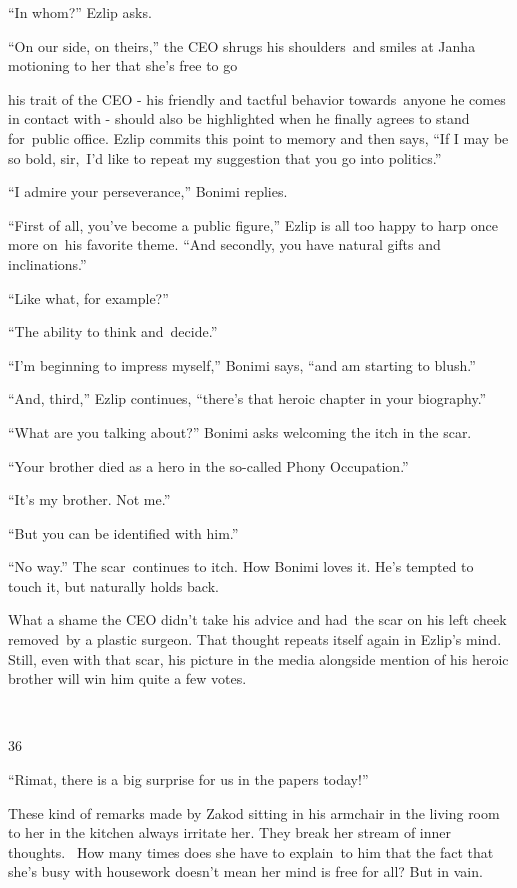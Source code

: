 \documentclass[twoside,11pt]{book}
\begin{document}
``In whom?'' Ezlip asks. 

``On our side, on theirs,'' the CEO shrugs his shoulders\ and smiles at Janha motioning to her
that she's free to go 

his trait of the CEO - his friendly and tactful behavior towards\ anyone he comes in contact with - should also be
highlighted when he finally agrees to stand for~public office.  Ezlip commits this point to memory and then says,
``If I may be so bold, sir,\ I'd like to repeat my suggestion that you go into politics.'' 

``I admire your perseverance,'' Bonimi replies. 

``First of all, you{}'ve become a public figure,'' Ezlip is all too happy to harp once more
on\ his favorite theme. ``And secondly, you have natural gifts and inclinations.''

``Like what, for example?'' 

``The ability to think and~decide.'' 

``I'm beginning to impress myself,'' Bonimi says, ``and am starting to
blush.'' 

``And, third,'' Ezlip continues, ``there's that heroic chapter in your
biography.''

``What are you talking about?'' Bonimi asks welcoming the itch in the scar.~

``Your brother died as a hero in the so-called Phony Occupation.'' 

``It's my brother. Not me.'' 

``But you can be identified with him.'' 

``No way.'' The scar\ continues to itch. How Bonimi loves it. He's tempted to touch it, but
naturally holds back.\ \ 

What a shame the CEO didn't take his advice and had\ the scar on his left cheek removed~by a plastic surgeon. That
thought repeats itself again in Ezlip's mind. Still, even with that scar, his picture in the media alongside mention of
his heroic brother will win him quite a few votes.

~

36 

``Rimat, there is a big surprise for us in the papers today!''

These kind of remarks made by Zakod sitting in his armchair in the living room to her in the kitchen always irritate
her. They break her stream of inner thoughts. {\ }How many times does
she have to explain{\ }to him that the fact that she's busy with housework
doesn't mean her mind is free for all? But in vain. 
\end{document}
